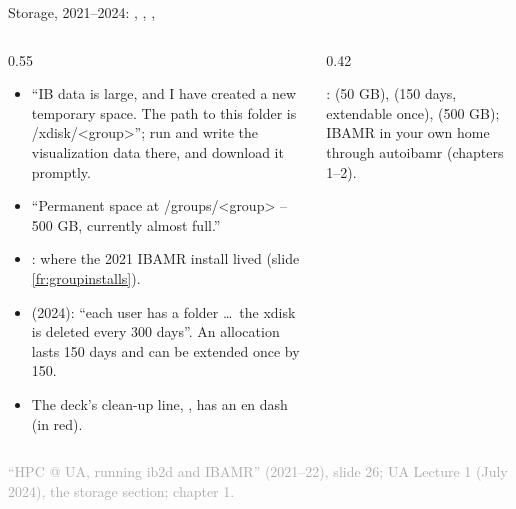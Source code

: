 \documentclass[aspectratio=169,11pt]{beamer}
\newcommand{\sourcecredit}[1]{\vfill\begin{flushright}\tiny\textcolor{DarkGray}{#1}\end{flushright}}
\newcommand{\ndashmark}{\textcolor{RubineRed}{\rmfamily\textendash}}
\begin{document}
\begin{frame}{Storage, 2021--2024: , , , }
\label{fr:uastorage}
\begin{columns}[T,onlytextwidth]
\begin{column}{0.55\textwidth}
\footnotesize
\begin{itemize}\setlength{\itemsep}{2pt}
  \item ``IB data is large, and I have created a new temporary space. The path to this folder is /xdisk/<group>''; run and write the visualization data there, and download it promptly.
  \item ``Permanent space at /groups/<group> -- 500 GB, currently almost full.''
  \item {}: where the 2021 IBAMR install lived (slide \ref{fr:groupinstalls}).
  \item {} (2024): ``each user has a folder \ldots\ the xdisk is deleted every 300 days''. An  allocation lasts 150 days and can be extended once by 150.
  \item The deck's clean-up line, \code{rm \ndashmark{}r my\_ib\_sim\_folder}, has an en dash (in red).
\end{itemize}
\end{column}
\begin{column}{0.42\textwidth}
\begin{punchbox}
\small {}:  (50 GB),  (150 days, extendable once),  (500 GB); IBAMR in your own home through autoibamr (chapters 1--2).
\end{punchbox}
\end{column}
\end{columns}
\sourcecredit{``HPC @ UA, running ib2d and IBAMR'' (2021--22), slide 26; UA Lecture 1 (July 2024), the storage section; chapter 1.}
\end{frame}
\end{document}

